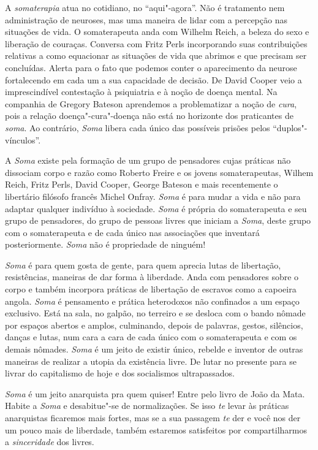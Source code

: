 A \emph{somaterapia} atua no cotidiano, no ``aqui"-agora''. Não é
tratamento nem administração de neuroses, mas uma maneira de lidar com a
percepção nas situações de vida. O somaterapeuta anda com Wilhelm Reich,
a beleza do sexo e liberação de couraças. Conversa com Fritz Perls
incorporando suas contribuições relativas a como equacionar as situações
de vida que abrimos e que precisam ser concluídas. Alerta para o fato
que podemos conter o aparecimento da neurose fortalecendo em cada um a
sua capacidade de decisão. De David Cooper veio a imprescindível
contestação à psiquiatria e à noção de doença mental. Na companhia de
Gregory Bateson aprendemos a problematizar a noção de \emph{cura}, pois
a relação doença"-cura"-doença não está no horizonte dos praticantes de
\emph{soma}. Ao contrário, \emph{Soma} libera cada único das possíveis
prisões pelos ``duplos"-vínculos''.

A \emph{Soma} existe pela formação de um grupo de pensadores cujas
práticas não dissociam corpo e razão como Roberto Freire e os jovens
somaterapeutas, Wilhem Reich, Fritz Perls, David Cooper, George Bateson
e mais recentemente o libertário filósofo francês Michel Onfray.
\emph{Soma} é para mudar a vida e não para adaptar qualquer indivíduo à
sociedade. \emph{Soma} é própria do somaterapeuta e seu grupo de
pensadores, do grupo de pessoas livres que iniciam a \emph{Soma}, deste
grupo com o somaterapeuta e de cada único nas associações que inventará
posteriormente. \emph{Soma} não é propriedade de ninguém!

\emph{Soma} é para quem gosta de gente, para quem aprecia lutas de
libertação, resistências, maneiras de dar forma à liberdade. Anda com
pensadores sobre o corpo e também incorpora práticas de libertação de
escravos como a capoeira angola. \emph{Soma} é pensamento e prática
heterodoxos não confinados a um espaço exclusivo. Está na sala, no
galpão, no terreiro e se desloca com o bando nômade por espaços abertos
e amplos, culminando, depois de palavras, gestos, silêncios, danças e
lutas, num cara a cara de cada único com o somaterapeuta e com os demais
nômades. \emph{Soma} é um jeito de existir único, rebelde e inventor de
outras maneiras de realizar a utopia da existência livre. De lutar no
presente para se livrar do capitalismo de hoje e dos socialismos
ultrapassados.

\emph{Soma} é um jeito anarquista pra quem quiser! Entre pelo livro de
João da Mata. Habite a \emph{Soma} e desabitue"-se de normalizações. Se
isso \emph{te} levar às práticas anarquistas ficaremos mais fortes, mas
se a sua passagem \emph{te} der e você nos der um pouco mais de
liberdade, também estaremos satisfeitos por compartilharmos a
\emph{sinceridade} dos livres.

